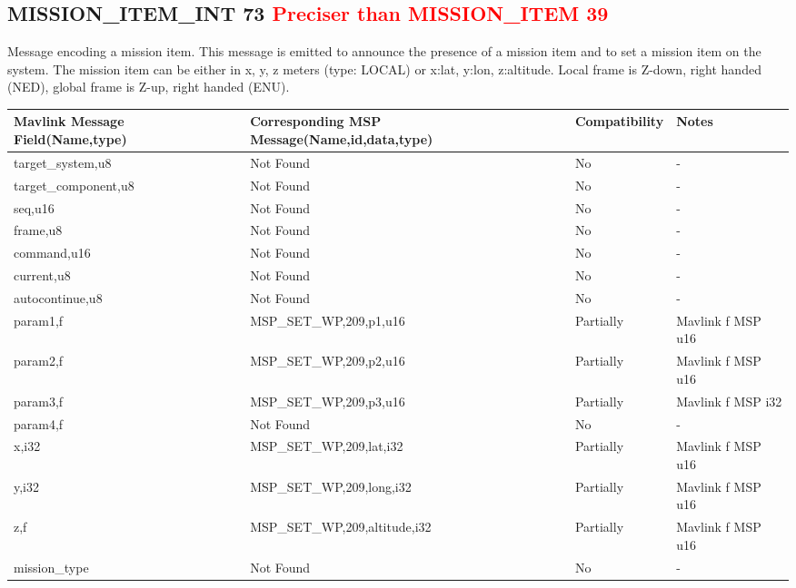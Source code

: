 \subsection{MISSION\_ITEM\_INT 73 \textcolor{red}{Preciser than MISSION\_ITEM 39 } } 
Message encoding a mission item. This message is emitted to announce the presence of a mission item and to set a mission item on the system. The mission item can be either in x, y, z meters (type: LOCAL) or x:lat, y:lon, z:altitude. Local frame is Z-down, right handed (NED), global frame is Z-up, right handed (ENU).\\

{
\centering
\begin{tabular}{ |p{4cm  } |p{7cm} | p{2cm}|m{5em}|}
\hline
Mavlink Message Field(Name,type)&Corresponding MSP Message(Name,id,data,type)& Compatibility & Notes\\
\hline
target\_system,u8 & Not Found & No & - \\
\hline
target\_component,u8 & Not Found & No & - \\
\hline
seq,u16 & Not Found & No & - \\
\hline
frame,u8 & Not Found & No & - \\
\hline
command,u16 & Not Found & No & - \\
\hline
current,u8 & Not Found & No & - \\
\hline
autocontinue,u8 & Not Found & No & - \\
\hline
\rowcolor{lightgray}
param1,f & MSP\_SET\_WP,209,p1,u16& Partially & Mavlink f MSP u16 \\
\hline
\rowcolor{lightgray}
param2,f & MSP\_SET\_WP,209,p2,u16& Partially & Mavlink f MSP u16 \\
\hline
\rowcolor{lightgray}
param3,f & MSP\_SET\_WP,209,p3,u16& Partially & Mavlink f MSP i32 \\
\hline
param4,f & Not Found & No & - \\
\hline
\rowcolor{lightgray}
x,i32 & MSP\_SET\_WP,209,lat,i32& Partially & Mavlink f MSP u16 \\
\hline
\rowcolor{lightgray}
y,i32 & MSP\_SET\_WP,209,long,i32& Partially & Mavlink f MSP u16 \\
\hline
\rowcolor{lightgray}
z,f & MSP\_SET\_WP,209,altitude,i32& Partially & Mavlink f MSP u16 \\
\hline
mission\_type &  Not Found & No & - \\

\end{tabular}
}

